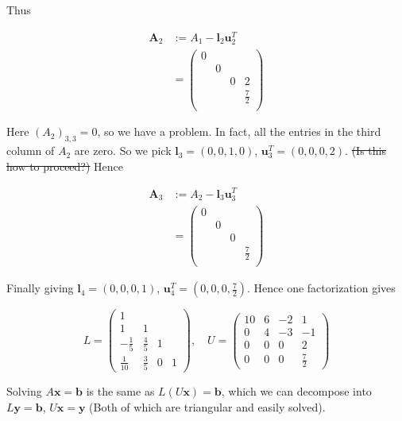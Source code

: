 \documentclass[a4paper]{article}
\begin{document}
Thus

\begin{align*}
\mathbf{A}_{2} & := A_{1} - \mathbf{l}_{2} \mathbf{u}_{2}^{T} \\
& = \left(
\begin{array}{cccc}
0 & & & \\
 & 0 & & \\
 & & 0 & 2 \\
& & & \frac{7}{2} \\
\end{array}
\right)
\end{align*}

Here $ (A_{2})_{3,3} = 0 $, so we have a problem. In fact, all the entries in the third column of $ A_{2} $ are zero. So we pick $ \mathbf{l}_{3} = (0,0,1,0) $, $ \mathbf{u}_{3}^{T} = (0,0,0,2) $. \st{(Is this how to proceed?)}  Hence

\begin{align*}
\mathbf{A}_{3} & := A_{2} - \mathbf{l}_{3} \mathbf{u}_{3}^{T} \\
& = \left(
\begin{array}{cccc}
0 & & & \\
& 0 & & \\
& & 0 & \\
& & & \frac{7}{2} \\
\end{array}
\right)
\end{align*}

Finally giving $ \mathbf{l}_{4} = (0,0,0,1) $, $ \mathbf{u}_{4}^{T} = (0,0,0,\frac{7}{2}) $. Hence one factorization gives


\[ L = \begin{pmatrix}
1 & & & \\
1 & 1  & & \\
-\frac{1}{5} & \frac{4}{5} & 1 & \\
\frac{1}{10} & \frac{3}{5} & 0 & 1
\end{pmatrix}, \quad U = \begin{pmatrix}
10 & 6 &-2 & 1 \\
0 & 4 & -3 & -1 \\
0 & 0 & 0 & 2\\
0 & 0 & 0 & \frac{7}{2}
\end{pmatrix} \]

Solving $ A \mathbf{x} = \mathbf{b} $ is the same as $ L(U \mathbf{x}) = \mathbf{b} $, which we can decompose into $ L \mathbf{y} = \mathbf{b} $, $ U \mathbf{x} = \mathbf{y} $ (Both of which are triangular and easily solved).
\end{document}
